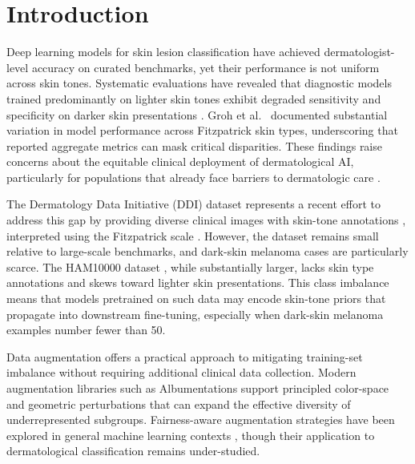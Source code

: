 \section{Introduction}

Deep learning models for skin lesion classification have achieved dermatologist-level accuracy on curated benchmarks, yet their performance is not uniform across skin tones. Systematic evaluations have revealed that diagnostic models trained predominantly on lighter skin tones exhibit degraded sensitivity and specificity on darker skin presentations \cite{Esteva2017, Daneshjou2022}. Groh et al.~\cite{Groh2021} documented substantial variation in model performance across Fitzpatrick skin types, underscoring that reported aggregate metrics can mask critical disparities. These findings raise concerns about the equitable clinical deployment of dermatological AI, particularly for populations that already face barriers to dermatologic care \cite{Adamson2018}.

The Dermatology Data Initiative (DDI) dataset represents a recent effort to address this gap by providing diverse clinical images with skin-tone annotations \cite{DDI2021}, interpreted using the Fitzpatrick scale \cite{Fitzpatrick1988}. However, the dataset remains small relative to large-scale benchmarks, and dark-skin melanoma cases are particularly scarce. The HAM10000 dataset \cite{Tschandl2018}, while substantially larger, lacks skin type annotations and skews toward lighter skin presentations. This class imbalance means that models pretrained on such data may encode skin-tone priors that propagate into downstream fine-tuning, especially when dark-skin melanoma examples number fewer than 50.

Data augmentation offers a practical approach to mitigating training-set imbalance without requiring additional clinical data collection. Modern augmentation libraries such as Albumentations \cite{Buslaev2020} support principled color-space and geometric perturbations that can expand the effective diversity of underrepresented subgroups. Fairness-aware augmentation strategies have been explored in general machine learning contexts \cite{Mehrabi2021}, though their application to dermatological classification remains under-studied.

